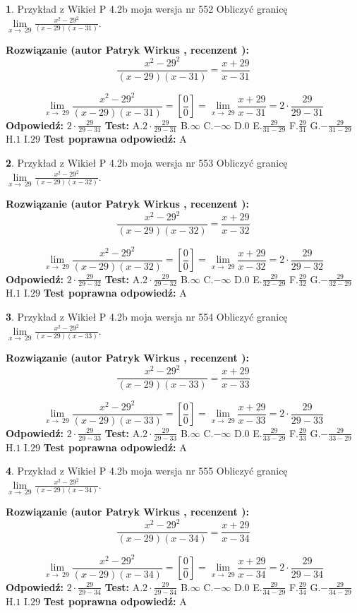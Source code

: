 \documentclass[12pt, a4paper]{article}
\theoremstyle{definition} %
\newtheorem{zad}{}
\newcommand{\zadStart}[1]{\begin{zad}#1\newline}
\newcommand{\zadStop}{\end{zad}}
\newcommand{\rozwStart}[2]{\noindent \textbf{Rozwiązanie (autor #1 , recenzent #2): }\newline}
\newcommand{\rozwStop}{\newline}
\newcommand{\odpStart}{\noindent \textbf{Odpowiedź:}\newline}
\newcommand{\odpStop}{\newline}
\newcommand{\testStart}{\noindent \textbf{Test:}\newline}
\newcommand{\testStop}{\newline}
\newcommand{\kluczStart}{\noindent \textbf{Test poprawna odpowiedź:}\newline}
\newcommand{\kluczStop}{\newline}
\begin{document}
\zadStart{Przykład z Wikieł P 4.2b moja wersja nr 552}
Obliczyć granicę $\lim\limits_{x\to\ 29}\frac{x^{2}-29^{2}}{(x-29)(x-31)}$.
\zadStop
\rozwStart{Patryk Wirkus}{}
$$\frac{x^{2}-29^{2}}{(x-29)(x-31)}=\frac{x+29}{x-31}$$

$$\lim\limits_{x\to\ 29}\frac{x^{2}-29^{2}}{(x-29)(x-31)}=[\frac{0}{0}]=\lim\limits_{x\to\ 29}\frac{x+29}{x-31}=2 \cdot \frac{29}{29-31}$$
\rozwStop
\odpStart
$2 \cdot \frac{29}{29-31}$
\odpStop
\testStart
A.$2 \cdot \frac{29}{29-31}$
B.$\infty$
C.$-\infty$
D.$0$
E.$\frac{29}{31-29}$
F.$\frac{29}{31}$
G.$-\frac{29}{31-29}$
H.$1$
I.$29$
\testStop
\kluczStart
A
\kluczStop



\zadStart{Przykład z Wikieł P 4.2b moja wersja nr 553}
Obliczyć granicę $\lim\limits_{x\to\ 29}\frac{x^{2}-29^{2}}{(x-29)(x-32)}$.
\zadStop
\rozwStart{Patryk Wirkus}{}
$$\frac{x^{2}-29^{2}}{(x-29)(x-32)}=\frac{x+29}{x-32}$$

$$\lim\limits_{x\to\ 29}\frac{x^{2}-29^{2}}{(x-29)(x-32)}=[\frac{0}{0}]=\lim\limits_{x\to\ 29}\frac{x+29}{x-32}=2 \cdot \frac{29}{29-32}$$
\rozwStop
\odpStart
$2 \cdot \frac{29}{29-32}$
\odpStop
\testStart
A.$2 \cdot \frac{29}{29-32}$
B.$\infty$
C.$-\infty$
D.$0$
E.$\frac{29}{32-29}$
F.$\frac{29}{32}$
G.$-\frac{29}{32-29}$
H.$1$
I.$29$
\testStop
\kluczStart
A
\kluczStop



\zadStart{Przykład z Wikieł P 4.2b moja wersja nr 554}
Obliczyć granicę $\lim\limits_{x\to\ 29}\frac{x^{2}-29^{2}}{(x-29)(x-33)}$.
\zadStop
\rozwStart{Patryk Wirkus}{}
$$\frac{x^{2}-29^{2}}{(x-29)(x-33)}=\frac{x+29}{x-33}$$

$$\lim\limits_{x\to\ 29}\frac{x^{2}-29^{2}}{(x-29)(x-33)}=[\frac{0}{0}]=\lim\limits_{x\to\ 29}\frac{x+29}{x-33}=2 \cdot \frac{29}{29-33}$$
\rozwStop
\odpStart
$2 \cdot \frac{29}{29-33}$
\odpStop
\testStart
A.$2 \cdot \frac{29}{29-33}$
B.$\infty$
C.$-\infty$
D.$0$
E.$\frac{29}{33-29}$
F.$\frac{29}{33}$
G.$-\frac{29}{33-29}$
H.$1$
I.$29$
\testStop
\kluczStart
A
\kluczStop



\zadStart{Przykład z Wikieł P 4.2b moja wersja nr 555}
Obliczyć granicę $\lim\limits_{x\to\ 29}\frac{x^{2}-29^{2}}{(x-29)(x-34)}$.
\zadStop
\rozwStart{Patryk Wirkus}{}
$$\frac{x^{2}-29^{2}}{(x-29)(x-34)}=\frac{x+29}{x-34}$$

$$\lim\limits_{x\to\ 29}\frac{x^{2}-29^{2}}{(x-29)(x-34)}=[\frac{0}{0}]=\lim\limits_{x\to\ 29}\frac{x+29}{x-34}=2 \cdot \frac{29}{29-34}$$
\rozwStop
\odpStart
$2 \cdot \frac{29}{29-34}$
\odpStop
\testStart
A.$2 \cdot \frac{29}{29-34}$
B.$\infty$
C.$-\infty$
D.$0$
E.$\frac{29}{34-29}$
F.$\frac{29}{34}$
G.$-\frac{29}{34-29}$
H.$1$
I.$29$
\testStop
\kluczStart
A
\kluczStop
\end{document}
